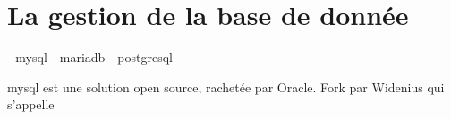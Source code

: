 \section{La gestion de la base de donnée}

- mysql
- mariadb
- postgresql

mysql  est une solution open source, rachetée par Oracle. Fork par Widenius qui s'appelle  
